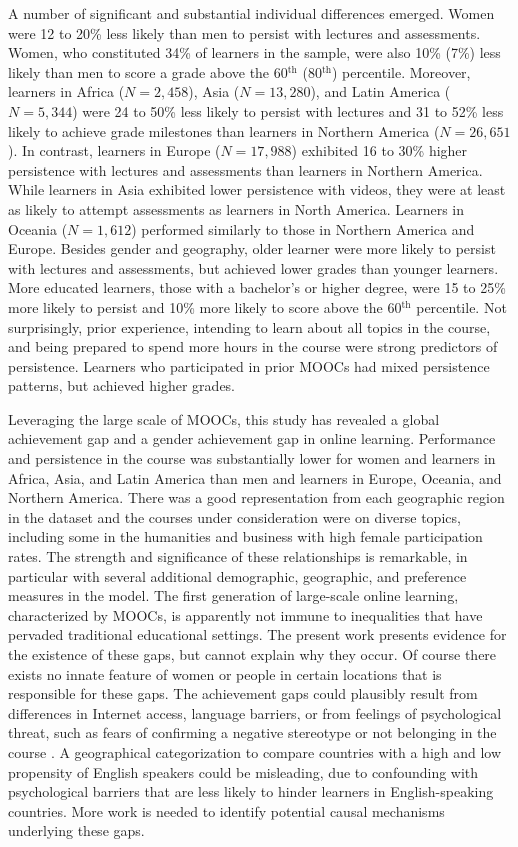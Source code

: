 \documentclass{sigchi}\usepackage[]{graphicx}\usepackage[]{color}
\begin{document}
A number of significant and substantial individual differences emerged. Women were 12 to 20\% less likely than men to persist with lectures and assessments. Women, who constituted 34\% of learners in the sample, were also 10\% (7\%) less likely than men to score a grade above the 60$^\text{th}$ (80$^\text{th}$) percentile.  Moreover, learners in Africa ($N = 2,458$), Asia ($N = 13,280$), and Latin America ($N = 5,344$) were 24 to 50\% less likely to persist with lectures and 31 to 52\% less likely to achieve grade milestones than learners in Northern America ($N = 26,651$). In contrast, learners in Europe ($N = 17,988$) exhibited 16 to 30\% higher persistence with lectures and assessments than learners in Northern America. While learners in Asia exhibited lower persistence with videos, they were at least as likely to attempt assessments as learners in North America. Learners in Oceania ($N = 1,612$) performed similarly to those in Northern America and Europe. Besides gender and geography, older learner were more likely to persist with lectures and assessments, but achieved lower grades than younger learners. More educated learners, those with a bachelor's or higher degree, were 15 to 25\% more likely to persist and 10\% more likely to score above the 60$^\text{th}$ percentile. Not surprisingly, prior experience, intending to learn about all topics in the course, and being prepared to spend more hours in the course were strong predictors of persistence. Learners who participated in prior MOOCs had mixed persistence patterns, but achieved higher grades.

Leveraging the large scale of MOOCs, this study has revealed a global achievement gap and a gender achievement gap in online learning. Performance and persistence in the course was substantially lower for women and learners in Africa, Asia, and Latin America than men and learners in Europe, Oceania, and Northern America. There was a good representation from each geographic region in the dataset and the courses under consideration were on diverse topics, including some in the humanities and business with high female participation rates. The strength and significance of these relationships is remarkable, in particular with several additional demographic, geographic, and preference measures in the model. The first generation of large-scale online learning, characterized by MOOCs, is apparently not immune to inequalities that have pervaded traditional educational settings. The present work presents evidence for the existence of these gaps, but cannot explain why they occur. Of course there exists no innate feature of women or people in certain locations that is responsible for these gaps. The achievement gaps could plausibly result from differences in Internet access, language barriers, or from feelings of psychological threat, such as fears of confirming a negative stereotype \cite{spencer1999stereotype} or not belonging in the course \cite{walton2007question}. A geographical categorization to compare countries with a high and low propensity of English speakers could be misleading, due to confounding with psychological barriers that are less likely to hinder learners in English-speaking countries. More work is needed to identify potential causal mechanisms underlying these gaps.
\end{document}
